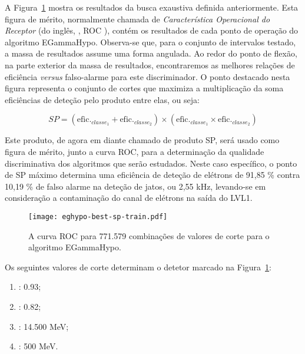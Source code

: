 A Figura~\ref{fig:eghypo-best-sp-train} mostra os resultados da busca
exaustiva definida anteriormente. Esta figura de mérito, normalmente
chamada de \textit{Característica Operacional do Receptor} (do inglês,
, ROC \cite{vantrees}), contém os
resultados de cada ponto de operação do algoritmo EGammaHypo. Observa-se
que, para o conjunto de intervalos testado, a massa de resultados assume uma
forma angulada. Ao redor do ponto de flexão, na parte exterior da massa de
resultados, encontraremos as melhores relações de eficiência \textit{versus}
falso-alarme para este discriminador. O ponto destacado nesta figura
representa o conjunto de cortes que maximiza a multiplicação da soma eficiências
de deteção pelo produto entre elas, ou seja:

\begin{equation}
SP = (\text{efic.}_{classe_1} + \text{efic.}_{classe_2}) \times (\text{efic.}_{classe_1} \times \text{efic.}_{classe_2})
\end{equation}

Este produto, de agora em diante chamado de produto SP, será usado como figura
de mérito, junto a curva ROC, para a determinação da qualidade discriminativa
dos algoritmos que serão estudados. Neste caso específico, o ponto de SP
máximo determina uma eficiência de deteção de elétrons de 91,85 \% contra
10,19 \% de falso alarme na deteção de jatos, ou 2,55 kHz, levando-se em
consideração a contaminação do canal de elétrons na saída do LVL1.

\begin{figure}
\begin{center}
\texttt{[image: eghypo-best-sp-train.pdf]}
\end{center}
\caption{A curva ROC para 771.579 combinações de valores de corte para o
algoritmo EGammaHypo.}
\label{fig:eghypo-best-sp-train}
\end{figure}

Os seguintes valores de corte determinam o detetor marcado na
Figura~\ref{fig:eghypo-best-sp-train}:
\begin{enumerate}
\item \rcore: 0.93;
\item \eratio: 0.82;
\item \etem: 14.500 MeV;
\item \ethad: 500 MeV.
\end{enumerate}

